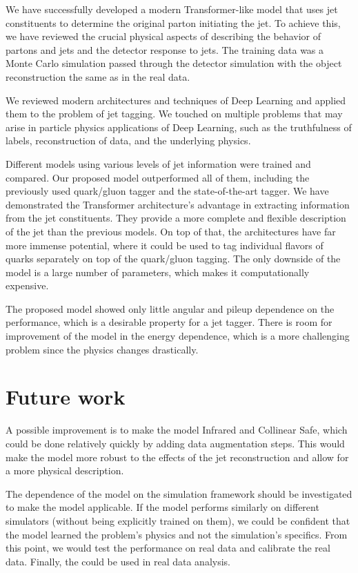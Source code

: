 

We have successfully developed a modern Transformer-like model that uses jet constituents to determine the original parton initiating the jet.
To achieve this, we have reviewed the crucial physical aspects of \QCD describing the behavior of partons and jets and the detector response to jets.
The training data was a Monte Carlo simulation passed through the detector simulation with the object reconstruction the same as in the real data.  

We reviewed modern architectures and techniques of Deep Learning and applied them to the problem of jet tagging.
We touched on multiple problems that may arise in particle physics applications of Deep Learning, such as the truthfulness of labels, reconstruction of data, and the underlying physics.

Different models using various levels of jet information were trained and compared.
Our proposed \depart model outperformed all of them, including the previously used quark/gluon tagger and the state-of-the-art \ParT tagger.
We have demonstrated the Transformer architecture's advantage in extracting information from the jet constituents.
They provide a more complete and flexible description of the jet than the previous models.
On top of that, the \trans architectures have far more immense potential, where it could be used to tag individual flavors of quarks separately on top of the quark/gluon tagging. 
The only downside of the model is a large number of parameters, which makes it computationally expensive.

The proposed model showed only little angular and pileup dependence on the performance, which is a desirable property for a jet tagger. 
There is room for improvement of the model in the energy dependence, which is a more challenging problem since the physics changes drastically.

\section{Future work}
A possible improvement is to make the model Infrared and Collinear Safe, which could be done relatively quickly by adding data augmentation steps. 
This would make the model more robust to the effects of the jet reconstruction and allow for a more physical description.

The dependence of the model on the simulation framework should be investigated to make the model applicable. 
If the model performs similarly on different simulators (without being explicitly trained on them), we could be confident that the model learned the problem's physics and not the simulation's specifics. 
From this point, we would test the performance on real data and calibrate the real data.
Finally, the \depart could be used in real data analysis.